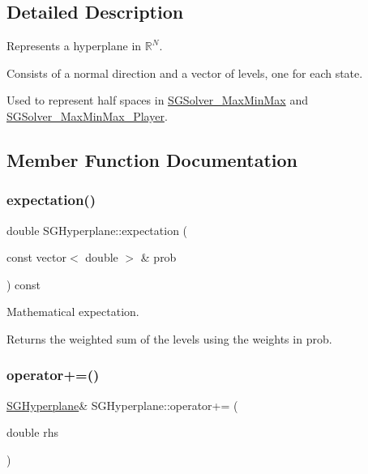 \subsection{Detailed Description}
Represents a hyperplane in $\mathbb{R}^N$. 

Consists of a normal direction and a vector of levels, one for each state.

Used to represent half spaces in \hyperlink{classSGSolver__MaxMinMax}{S\+G\+Solver\+\_\+\+Max\+Min\+Max} and \hyperlink{classSGSolver__MaxMinMax__3Player}{S\+G\+Solver\+\_\+\+Max\+Min\+Max\+\_\+Player}. 

\subsection{Member Function Documentation}
\mbox{\label{classSGHyperplane_a54ab1a4f18536c7eef048fb6579e797a}} 
\subsubsection{\texorpdfstring{expectation()}{expectation()}}
{\footnotesize\ttfamily double S\+G\+Hyperplane\+::expectation (\begin{DoxyParamCaption}\item[{const vector$<$ double $>$ \&}]{prob }\end{DoxyParamCaption}) const}



Mathematical expectation. 

Returns the weighted sum of the levels using the weights in prob. \mbox{\label{classSGHyperplane_a8ae5f73b29eb37d186e28e2397d27eca}} 
\subsubsection{\texorpdfstring{operator+=()}{operator+=()}}
{\footnotesize\ttfamily \hyperlink{classSGHyperplane}{S\+G\+Hyperplane}\& S\+G\+Hyperplane\+::operator+= (\begin{DoxyParamCaption}\item[{double}]{rhs }\end{DoxyParamCaption})}



